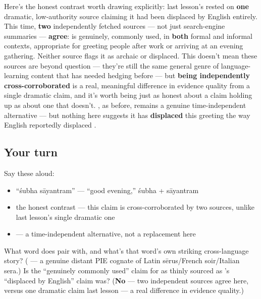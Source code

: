 \begin{culture}
Here's the honest contrast worth drawing explicitly: last lesson's \textbf{} rested on \textbf{one} dramatic, low-authority source claiming it had been displaced by English entirely. This time, \textbf{two} independently fetched sources — not just search-engine summaries — \textbf{agree}: \textbf{ } is genuinely, commonly used, in \textbf{both} formal and informal contexts, appropriate for greeting people after work or arriving at an evening gathering. Neither source flags it as archaic or displaced. This doesn't mean these sources are beyond question — they're still the same general genre of language-learning content that has needed hedging before — but \textbf{being independently cross-corroborated} is a real, meaningful difference in evidence quality from a single dramatic claim, and it's worth being just as honest about a claim holding up as about one that doesn't. \textbf{}, as before, remains a genuine time-independent alternative — but nothing here suggests it has \textbf{displaced} this greeting the way English reportedly displaced .
\end{culture}

\subsection*{Your turn}
Say these aloud:

\begin{itemize}
\raggedright
  \item \textquotedblleft{}śubha sāyantram\textquotedblright{} — \textquotedblleft{}good evening,\textquotedblright{} śubha + sāyantram
  \item the honest contrast — this claim is cross-corroborated by two sources, unlike last lesson's single dramatic one
  \item {} — a time-independent alternative, not a replacement here
\end{itemize}

\begin{tcolorbox}[breakable,colback=teal!4,colframe=teal!35!black,title={Before you move on}]
What word does   pair with, and what's that word's own striking cross-language story? (\textbf{} — a genuine distant PIE cognate of Latin sērus/French soir/Italian sera.) Is the \textquotedblleft{}genuinely commonly used\textquotedblright{} claim for   as thinly sourced as 's \textquotedblleft{}displaced by English\textquotedblright{} claim was? (\textbf{No} — two independent sources agree here, versus one dramatic claim last lesson — a real difference in evidence quality.)
\end{tcolorbox}
